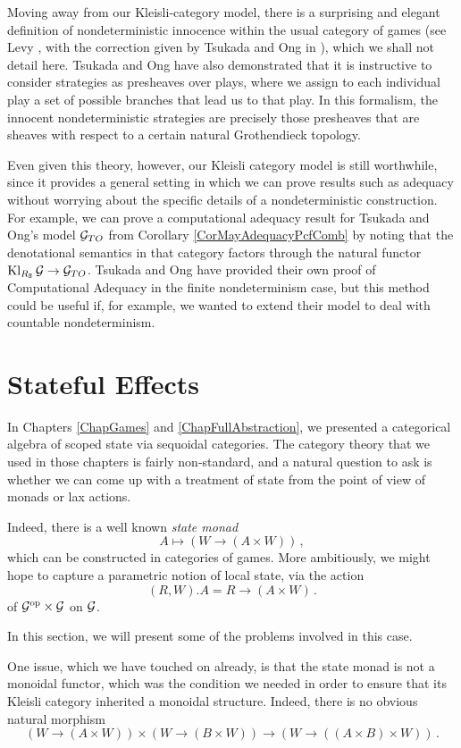 Moving away from our Kleisli-category model, there is a surprising and elegant definition of nondeterministic innocence within the usual category of games (see Levy \cite{levy2014morphisms}, with the correction given by Tsukada and Ong in \cite[Proposition 46]{TsukadaSheaves}), which we shall not detail here.
Tsukada and Ong have also demonstrated that it is instructive to consider strategies as presheaves over plays, where we assign to each individual play a set of possible branches that lead us to that play.  
In this formalism, the innocent nondeterministic strategies are precisely those presheaves that are sheaves with respect to a certain natural Grothendieck topology.

Even given this theory, however, our Kleisli category model is still worthwhile, since it provides a general setting in which we can prove results such as adequacy without worrying about the specific details of a nondeterministic construction.  
For example, we can prove a computational adequacy result for Tsukada and Ong's model $\mathcal G_{TO}$ from Corollary \ref{CorMayAdequacyPcfComb} by noting that the denotational semantics in that category factors through the natural functor $\operatorname{Kl}_{R_{\mathbb{B}}}\mathcal G \to \mathcal G_{TO}$.  
Tsukada and Ong have provided their own proof of Computational Adequacy in the finite nondeterminism case, but this method could be useful if, for example, we wanted to extend their model to deal with countable nondeterminism.

\section{Stateful Effects}

In Chapters \ref{ChapGames} and \ref{ChapFullAbstraction}, we presented a categorical algebra of scoped state via sequoidal categories.  
The category theory that we used in those chapters is fairly non-standard, and a natural question to ask is whether we can come up with a treatment of state from the point of view of monads or lax actions.

Indeed, there is a well known \emph{state monad}
\[
  A \mapsto (W \to (A \times W))\,,
  \]
which can be constructed in categories of games.  
More ambitiously, we might hope to capture a parametric notion of local state, via the action
\[
  (R,W).A = R \to (A \times W)\,.
  \]
of $\mathcal G^{\mathrm{op}} \times \mathcal G$ on $\mathcal G$.

In this section, we will present some of the problems involved in this case.  

One issue, which we have touched on already, is that the state monad is not a monoidal functor, which was the condition we needed in order to ensure that its Kleisli category inherited a monoidal structure.  
Indeed, there is no obvious natural morphism
\[
  (W \to (A \times W)) \times (W \to (B \times W)) \to (W \to ((A \times B) \times W))\,.
  \]

